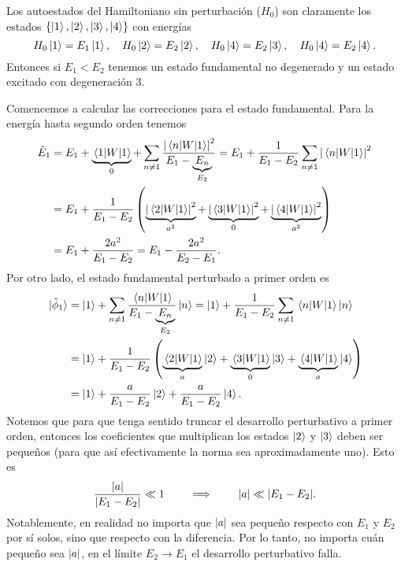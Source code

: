 \documentclass[10pt, a4paper]{article}
\numberwithin{equation}{subsection}
\begin{document}
Los autoestados del Hamiltoniano sin perturbación ($H_0$) son claramente los
estados $\set{\ket{1}, \ket{2}, \ket{3}, \ket{4}}$ con energías
\begin{equation}
  H_0\ket{1} = E_1\ket{1}, \quad
  H_0\ket{2} = E_2\ket{2}, \quad
  H_0\ket{4} = E_2\ket{3}, \quad
  H_0\ket{4} = E_2\ket{4}.
\end{equation}
Entonces si $E_1 < E_2$ tenemos un estado fundamental no degenerado y un estado
excitado con degeneración 3.

\bigbreak

Comencemos a calcular las correcciones para el estado fundamental. Para la
energía hasta segundo orden tenemos
\begin{align}
  \tilde{E}_{1}
  &= E_{1} + \underbrace{\matrixel{1}{W}{1}}_{0} + \sum_{n \neq 1}
    \frac{\abs{\matrixel{n}{W}{1}}^2}{E_1 - \underbrace{E_n}_{E_2}}
  = E_{1} + \frac{1}{E_1 - E_2} \sum_{n \neq 1}
    \abs{\matrixel{n}{W}{1}}^2 \nonumber \\
  &= E_{1} + \frac{1}{E_1 - E_2} \left(
    \underbrace{\abs{\matrixel{2}{W}{1}}^2}_{a^2} +
    \underbrace{\abs{\matrixel{3}{W}{1}}^2}_{0} +
    \underbrace{\abs{\matrixel{4}{W}{1}}^2}_{a^2} \right) \nonumber \\
  &= E_{1} + \frac{2a^2}{E_1 - E_2}
  = E_{1} - \frac{2a^2}{E_2 - E_1}.
\end{align}
Por otro lado, el estado fundamental perturbado a primer orden es
\begin{align}
  \ket*{\tilde{\phi}_{1}}
  &= \ket{1} + \sum_{n \neq 1} \frac{\matrixel{n}{W}{1}}{E_1 -
    \underbrace{E_n}_{E_2}} \ket{n}
  = \ket{1} + \frac{1}{E_1 - E_2} \sum_{n \neq 1} \matrixel{n}{W}{1} \ket{n}
    \nonumber \\
  &= \ket{1} + \frac{1}{E_1 - E_2} \left( \underbrace{\matrixel{2}{W}{1}}_{a}
    \ket{2} + \underbrace{\matrixel{3}{W}{1}}_{0} \ket{3} +
    \underbrace{\matrixel{4}{W}{1}}_{a} \ket{4} \right) \nonumber \\
  &= \ket{1} + \frac{a}{E_1 - E_2} \ket{2} + \frac{a}{E_1 - E_2} \ket{4}.
\end{align} 
Notemos que para que tenga sentido truncar el desarrollo perturbativo a primer
orden, entonces los coeficientes que multiplican los estados $\ket{2}$ y
$\ket{3}$ deben ser pequeños (para que así efectivamente la norma sea
aproximadamente uno). Esto es
\begin{equation}
  \frac{\abs{a}}{\abs{E_1 - E_2}} \ll 1
  \qquad \implies \qquad
  \abs{a} \ll \abs{E_1 - E_2}.
\end{equation}
Notablemente, en realidad no importa que $\abs{a}$ sea pequeño respecto con
$E_1$ y $E_2$ por sí solos, sino que respecto con la diferencia. Por lo tanto,
no importa cuán pequeño sea $\abs{a}$, en el límite $E_2 \to E_1$ el desarrollo
perturbativo falla.
\end{document}

